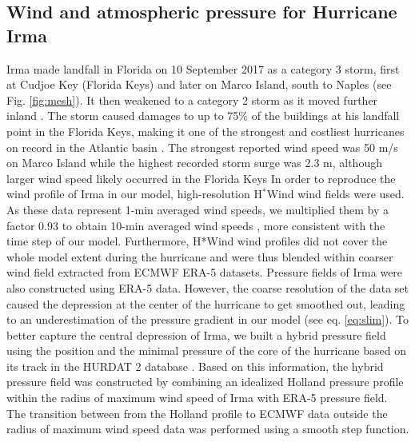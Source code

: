 \documentclass[11pt,a4paper]{article}
\begin{document}
\subsection{Wind and atmospheric pressure for Hurricane Irma}
Irma made landfall in Florida on 10 September 2017 as a category 3 storm, first at Cudjoe Key (Florida Keys) and later on Marco Island, south to Naples (see Fig. \ref{fig:mesh}). It then weakened to a category 2 storm as it moved further inland \citep{pinelli2018overview}. The storm caused damages to up to 75\% of the buildings at his landfall point in the Florida Keys, making it one of the strongest and costliest hurricanes on record in the Atlantic basin \citep{xian2018brief,zhang2019modeling}. The strongest reported wind speed was 50 m/s on Marco Island while the highest recorded storm surge was 2.3 m, although larger wind speed likely occurred in the Florida Keys \citep{pinelli2018overview}
In order to reproduce the wind profile of Irma in our model, high-resolution H$^\ast$Wind \citep{powell1998hrd} wind fields were used. As these data represent 1-min averaged wind speeds, we multiplied them by a factor 0.93 to obtain 10-min averaged wind speeds \citep{harper2010guidelines}, more consistent with the time step of our model. Furthermore, H*Wind wind profiles did not cover the whole model extent during the hurricane and were thus blended within coarser wind field extracted from ECMWF ERA-5 datasets. Pressure fields of Irma were also constructed using ERA-5 data. However, the coarse resolution of the data set caused the depression at the center of the hurricane to get smoothed out, leading to an underestimation of the pressure gradient in our model (see eq. \ref{eq:slim}). To better capture the central depression of Irma, we built a hybrid pressure field using the position and the minimal pressure of the core of the hurricane based on its track in the HURDAT 2 database \citep{landsea2013atlantic}. Based on this information, the hybrid pressure field was constructed by combining an idealized Holland pressure profile \citep{lin2012hurricane} within the radius of maximum wind speed of Irma \citep{knaff2018statistical} with ERA-5 pressure field. The transition between from the Holland profile to ECMWF data outside the radius of maximum wind speed data was performed using a smooth step function.
\end{document}

